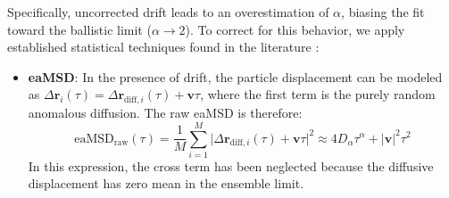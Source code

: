 Specifically, uncorrected drift leads to an overestimation of $\alpha$, biasing the fit toward the ballistic limit ($\alpha \to 2$). To correct for this behavior, we apply established statistical techniques found in the literature \cite{QIAN1991910}:
\begin{itemize}
    \item \textbf{eaMSD}: In the presence of drift, the particle displacement can be modeled as $\Delta\mathbf{r}_i(\tau) = \Delta\mathbf{r}_{\mathrm{diff},i}(\tau) + \mathbf{v}\tau$, where the first term is the purely random anomalous diffusion. The raw eaMSD is therefore:
    \begin{equation*}
    \mathrm{eaMSD}_{\mathrm{raw}}(\tau) = \frac{1}{M} \sum_{i=1}^{M} \lvert \Delta\mathbf{r}_{\mathrm{diff},i}(\tau) + \mathbf{v}\tau \rvert^2 \approx 4D_\alpha\tau^\alpha + \lvert\mathbf{v}\rvert^2\tau^2
    \end{equation*} 
    In this expression, the cross term has been neglected because the diffusive displacement has zero mean in the ensemble limit.


\end{itemize}
